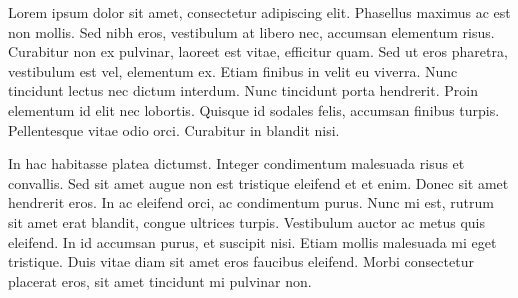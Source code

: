 \documentclass[portrait,final,a0paper]{baposter}
\begin{document}
\begin{poster}
{  
   Lorem ipsum dolor sit amet, consectetur adipiscing elit. Phasellus maximus ac est non mollis. Sed nibh eros, vestibulum at libero nec, accumsan elementum risus. Curabitur non ex pulvinar, laoreet est vitae, efficitur quam. Sed ut eros pharetra, vestibulum est vel, elementum ex. Etiam finibus in velit eu viverra. Nunc tincidunt lectus nec dictum interdum. Nunc tincidunt porta hendrerit. Proin elementum id elit nec lobortis. Quisque id sodales felis, accumsan finibus turpis. Pellentesque vitae odio orci. Curabitur in blandit nisi.

In hac habitasse platea dictumst. Integer condimentum malesuada risus et convallis. Sed sit amet augue non est tristique eleifend et et enim. Donec sit amet hendrerit eros. In ac eleifend orci, ac condimentum purus. Nunc mi est, rutrum sit amet erat blandit, congue ultrices turpis. Vestibulum auctor ac metus quis eleifend. In id accumsan purus, et suscipit nisi. Etiam mollis malesuada mi eget tristique. Duis vitae diam sit amet eros faucibus eleifend. Morbi consectetur placerat eros, sit amet tincidunt mi pulvinar non. 
\vspace{0.3em}
 }
 
 




\end{poster}
\end{document}

